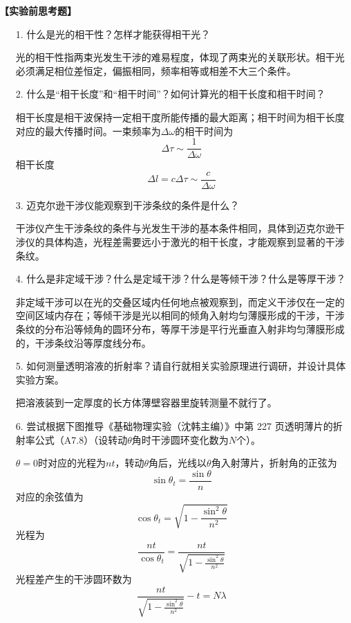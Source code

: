 \documentclass[11pt,a4paper]{ctexart}
\newcommand{\beq}{\begin{equation}}
\newcommand{\eeq}{\end{equation}}
\begin{document}
\textbf{【实验前思考题】}
\begin{enumerate}
 \item[1.] 什么是光的相干性？怎样才能获得相干光？\par
光的相干性指两束光发生干涉的难易程度，体现了两束光的关联形状。相干光必须满足相位差恒定，偏振相同，频率相等或相差不大三个条件。
 \item[2.] 什么是“相干长度”和“相干时间”？如何计算光的相干长度和相干时间？\par
相干长度是相干波保持一定相干度所能传播的最大距离；相干时间为相干长度对应的最大传播时间。一束频率为$\Delta \omega$的相干时间为
\beq
\Delta \tau \sim \frac{1}{\Delta \omega}
\eeq
相干长度
\beq
\Delta l = c\Delta \tau \sim \frac{c}{\Delta \omega}
\eeq
 \item[3.] 迈克尔逊干涉仪能观察到干涉条纹的条件是什么？\par
干涉仪产生干涉条纹的条件与光发生干涉的基本条件相同，具体到迈克尔逊干涉仪的具体构造，光程差需要远小于激光的相干长度，才能观察到显著的干涉条纹。
 \item[4.] 什么是非定域干涉？什么是定域干涉？什么是等倾干涉？什么是等厚干涉？\par
非定域干涉可以在光的交叠区域内任何地点被观察到，而定义干涉仅在一定的空间区域内存在；等倾干涉是光以相同的倾角入射均匀薄膜形成的干涉，干涉条纹的分布沿等倾角的圆环分布，等厚干涉是平行光垂直入射非均匀薄膜形成的，干涉条纹沿等厚度线分布。
 \item[5.] 如何测量透明溶液的折射率？请自行就相关实验原理进行调研，并设计具体实验方案。\par
把溶液装到一定厚度的长方体薄壁容器里旋转测量不就行了。
 \item[6.] 尝试根据下图推导《基础物理实验（沈韩主编）》中第 227 页透明薄片的折射率公式（A7.8）（设转动$\theta$角时干涉圆环变化数为$N$个）。\par
$\theta = 0$时对应的光程为$nt$，转动$\theta$角后，光线以$\theta$角入射薄片，折射角的正弦为
\beq
\sin \theta_t = \frac{\sin \theta}{n}
\eeq
对应的余弦值为
\beq
\cos \theta_t = \sqrt{1 - \frac{\sin^2 \theta}{n^2}}
\eeq
光程为
\beq
\frac{nt}{\cos \theta_t} = \frac{nt}{\sqrt{1 - \frac{\sin^2 \theta}{n^2}}}
\eeq
光程差产生的干涉圆环数为
\beq
\frac{nt}{\sqrt{1 - \frac{\sin^2 \theta}{n^2}}} - t = N\lambda
\eeq

\end{enumerate}
\end{document}
